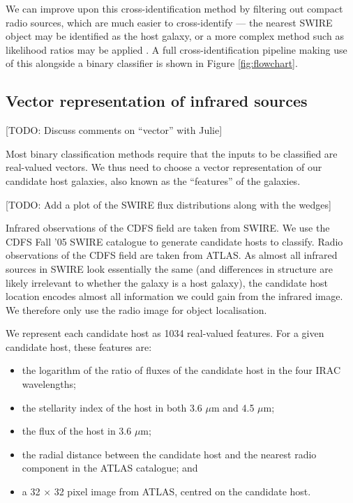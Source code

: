 \documentclass[fleqn,usenatbib,usedcolumn]{mnras}
\begin{document}
    We can improve upon this cross-identification method by filtering out
    compact radio sources, which are much easier to cross-identify --- the
    nearest SWIRE object may be identified as the host galaxy, or a more
    complex method such as likelihood ratios may be applied
    \citep[see][]{weston17}. A full cross-identification pipeline making use
    of this alongside a binary classifier is shown in Figure
    \ref{fig:flowchart}.

  \subsection{Vector representation of infrared
  sources}\label{vector-representation-of-infrared-sources}

    {[}TODO: Discuss comments on ``vector'' with Julie{]}

    Most binary classification methods require that the inputs to be
    classified are real-valued vectors. We thus need to choose a vector
    representation of our candidate host galaxies, also known as the
    ``features'' of the galaxies.

    {[}TODO: Add a plot of the SWIRE flux distributions along with the
    wedges{]}

    Infrared observations of the CDFS field are taken from SWIRE. We use the
    CDFS Fall '05 SWIRE catalogue \citep{surace05swire} to generate candidate
    hosts to classify. Radio observations of the CDFS field are taken from
    ATLAS. As almost all infrared sources in SWIRE look essentially the same
    (and differences in structure are likely irrelevant to whether the galaxy
    is a host galaxy), the candidate host location encodes almost all
    information we could gain from the infrared image. We therefore only use
    the radio image for object localisation.

    We represent each candidate host as 1034 real-valued features. For a given
    candidate host, these features are:
    \begin{itemize}
      \item the logarithm of the ratio of fluxes of the candidate host in the
        four IRAC wavelengths;
      \item the stellarity index of the host in both 3.6 $\mu$m and 4.5
        $\mu$m;
      \item the flux of the host in 3.6 $\mu$m;
      \item the radial distance between the candidate host and the nearest
        radio component in the ATLAS catalogue; and
      \item a 32 $\times$ 32 pixel image from ATLAS, centred on the candidate
        host.
    \end{itemize}
\end{document}
